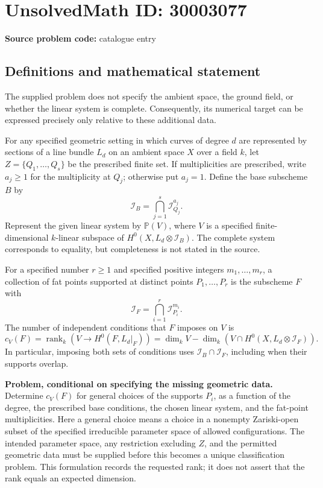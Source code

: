 \documentclass[11pt]{article}
\begin{document}
\section*{UnsolvedMath ID: 30003077}
\textbf{Source problem code:} catalogue entry
\subsection{Definitions and mathematical statement}
The supplied problem does not specify the ambient space, the ground field, or whether the linear system is complete. Consequently, its numerical target can be expressed precisely only relative to these additional data.

For any specified geometric setting in which curves of degree \(d\) are represented by sections of a line bundle \(L_d\) on an ambient space \(X\) over a field \(k\), let \(Z=\{Q_1,\ldots,Q_s\}\) be the prescribed finite set. If multiplicities are prescribed, write \(a_j\geq 1\) for the multiplicity at \(Q_j\); otherwise put \(a_j=1\). Define the base subscheme \(B\) by
\[
\mathcal I_B=\bigcap_{j=1}^{s}\mathcal I_{Q_j}^{a_j}.
\]
Represent the given linear system by \(\mathbb P(V)\), where \(V\) is a specified finite-dimensional \(k\)-linear subspace of \(H^0(X,L_d\otimes\mathcal I_B)\). The complete system corresponds to equality, but completeness is not stated in the source.

For a specified number \(r\geq 1\) and specified positive integers \(m_1,\ldots,m_r\), a collection of fat points supported at distinct points \(P_1,\ldots,P_r\) is the subscheme \(F\) with
\[
\mathcal I_F=\bigcap_{i=1}^{r}\mathcal I_{P_i}^{m_i}.
\]
The number of independent conditions that \(F\) imposes on \(V\) is
\[
 c_V(F)=\operatorname{rank}_k\!\left(V\longrightarrow H^0(F,L_d|_F)\right)
 =\dim_k V-\dim_k\!\left(V\cap H^0(X,L_d\otimes\mathcal I_F)\right).
\]
In particular, imposing both sets of conditions uses \(\mathcal I_B\cap\mathcal I_F\), including when their supports overlap.

\textbf{Problem, conditional on specifying the missing geometric data.} Determine \(c_V(F)\) for general choices of the supports \(P_i\), as a function of the degree, the prescribed base conditions, the chosen linear system, and the fat-point multiplicities. Here a general choice means a choice in a nonempty Zariski-open subset of the specified irreducible parameter space of allowed configurations. The intended parameter space, any restriction excluding \(Z\), and the permitted geometric data must be supplied before this becomes a unique classification problem. This formulation records the requested rank; it does not assert that the rank equals an expected dimension.
\end{document}
